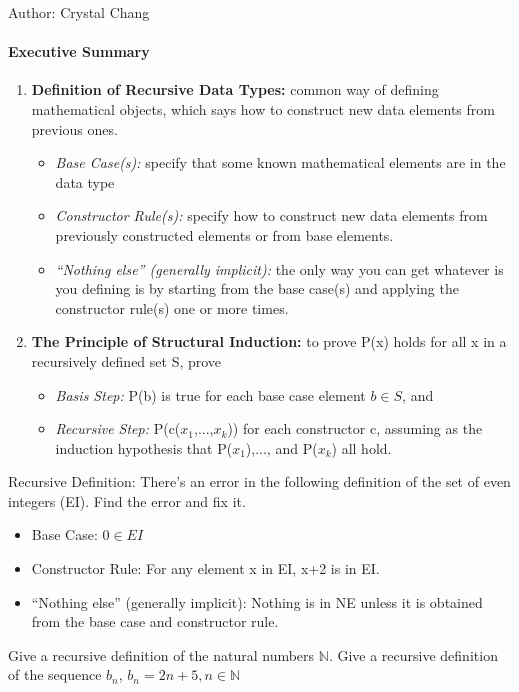 \documentclass[solution, letterpaper]{cs20inclass}
\begin{document}

\noindent Author: Crystal Chang

\paragraph*{Executive Summary}
\begin{enumerate}
\item \textbf{Definition of Recursive Data Types:} common way of defining mathematical objects, which says how to construct new data elements from previous ones.
\begin{itemize}
\item {\em Base Case(s):} specify that some known mathematical elements are in the data type
\item {\em Constructor Rule(s):} specify how to construct new data elements from previously constructed elements or from base elements.
\item {\em “Nothing else” (generally implicit):} the only way you can get whatever is you defining is by starting from the base case(s) and applying the constructor rule(s) one or more times.
\end{itemize}

\item \textbf{The Principle of Structural Induction:} to prove P(x) holds for all x in a recursively defined set S, prove
\begin{itemize}
\item {\em Basis Step:} P(b) is true for each base case element $b \in S$, and 
\item {\em Recursive Step:} P(c($x_1$,...,$x_k$)) for each constructor c, assuming as the induction hypothesis that P($x_1$),..., and P($x_k$) all hold.
\end{itemize}
\end{enumerate}

\problem Recursive Definition:
\subproblem There's an error in the following definition of the set of even integers (EI). Find the error and fix it. 
\begin{itemize}
\item Base Case:  $0\in EI$
\item Constructor Rule: For any element x in EI, x+2 is in EI. 
\item “Nothing else” (generally implicit): Nothing is in NE unless it is obtained from the base case and constructor rule.
\end{itemize}
\subproblem Give a recursive definition of the natural numbers $\mathbb{N}$.
\subproblem Give a recursive definition of the sequence $b_n$, $b_n=2n+5,  n\in\mathbb{N}$
\pagebreak
\end{document}
